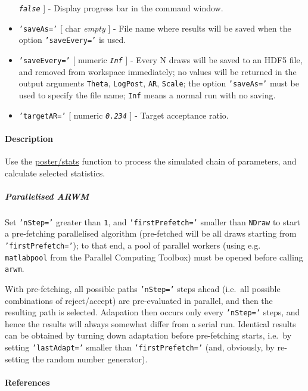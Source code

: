 \begin{itemize}
   \emph{\texttt{false}} {]} - Display progress bar in the command
   window.
 \item
   \texttt{'saveAs='} {[} char \textbar{} \emph{empty} {]} - File name
   where results will be saved when the option \texttt{'saveEvery='} is
   used.
 \item
   \texttt{'saveEvery='} {[} numeric \textbar{} \emph{\texttt{Inf}} {]} -
   Every N draws will be saved to an HDF5 file, and removed from
   workspace immediately; no values will be returned in the output
   arguments \texttt{Theta}, \texttt{LogPost}, \texttt{AR},
   \texttt{Scale}; the option \texttt{'saveAs='} must be used to specify
   the file name; \texttt{Inf} means a normal run with no saving.
 \item
   \texttt{'targetAR='} {[} numeric \textbar{} \emph{\texttt{0.234}} {]}
   - Target acceptance ratio.
 \end{itemize}
 
 \paragraph{Description}
 
 Use the \url{poster/stats} function to process the simulated chain of
 parameters, and calculate selected statistics.
 
 \subparagraph{Parallelised ARWM}
 
 Set \texttt{'nStep='} greater than \texttt{1}, and
 \texttt{'firstPrefetch='} smaller than \texttt{NDraw} to start a
 pre-fetching parallelised algorithm (pre-fetched will be all draws
 starting from \texttt{'firstPrefetch='}); to that end, a pool of
 parallel workers (using e.g. \texttt{matlabpool} from the Parallel
 Computing Toolbox) must be opened before calling \texttt{arwm}.
 
 With pre-fetching, all possible paths \texttt{'nStep='} steps ahead
 (i.e.~all possible combinations of reject/accept) are pre-evaluated in
 parallel, and then the resulting path is selected. Adapation then occurs
 only every \texttt{'nStep='} steps, and hence the results will always
 somewhat differ from a serial run. Identical results can be obtained by
 turning down adaptation before pre-fetching starts, i.e.~by setting
 \texttt{'lastAdapt='} smaller than \texttt{'firstPrefetch='} (and,
 obviously, by re-setting the random number generator).
 
 \paragraph{References}
 
